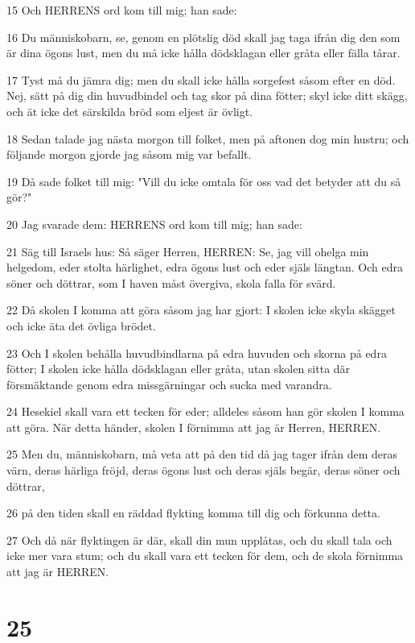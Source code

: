 \par 15 Och HERRENS ord kom till mig; han sade:
\par 16 Du människobarn, se, genom en plötslig död skall jag taga ifrån dig den som är dina ögons lust, men du må icke hålla dödsklagan eller gråta eller fälla tårar.
\par 17 Tyst må du jämra dig; men du skall icke hålla sorgefest såsom efter en död. Nej, sätt på dig din huvudbindel och tag skor på dina fötter; skyl icke ditt skägg, och ät icke det särskilda bröd som eljest är övligt.
\par 18 Sedan talade jag nästa morgon till folket, men på aftonen dog min hustru; och följande morgon gjorde jag såsom mig var befallt.
\par 19 Då sade folket till mig: "Vill du icke omtala för oss vad det betyder att du så gör?"
\par 20 Jag svarade dem: HERRENS ord kom till mig; han sade:
\par 21 Säg till Israels hus: Så säger Herren, HERREN: Se, jag vill ohelga min helgedom, eder stolta härlighet, edra ögons lust och eder själs längtan. Och edra söner och döttrar, som I haven måst övergiva, skola falla för svärd.
\par 22 Då skolen I komma att göra såsom jag har gjort: I skolen icke skyla skägget och icke äta det övliga brödet.
\par 23 Och I skolen behålla huvudbindlarna på edra huvuden och skorna på edra fötter; I skolen icke hålla dödsklagan eller gråta, utan skolen sitta där försmäktande genom edra missgärningar och sucka med varandra.
\par 24 Hesekiel skall vara ett tecken för eder; alldeles såsom han gör skolen I komma att göra. När detta händer, skolen I förnimma att jag är Herren, HERREN.
\par 25 Men du, människobarn, må veta att på den tid då jag tager ifrån dem deras värn, deras härliga fröjd, deras ögons lust och deras själs begär, deras söner och döttrar,
\par 26 på den tiden skall en räddad flykting komma till dig och förkunna detta.
\par 27 Och då när flyktingen är där, skall din mun upplåtas, och du skall tala och icke mer vara stum; och du skall vara ett tecken för dem, och de skola förnimma att jag är HERREN.

\chapter{25}

